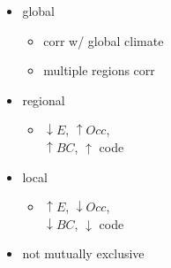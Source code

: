 \documentclass{beamer} \usepackage{amsmath,amsthm}
\begin{document}
\begin{frame}
\begin{columns}
\begin{column}{0.55\textwidth}
      \tiny{}
    \end{column}
    \begin{column}{0.45\textwidth}
      \begin{itemize}
        \item global
          \begin{itemize}
            \item corr w/ global climate
            \item multiple regions corr
          \end{itemize}
        \item regional
          \begin{itemize}
            \item \(\downarrow E\), \(\uparrow Occ\), \\\(\uparrow BC\), \(\uparrow\) code
          \end{itemize}
        \item local
          \begin{itemize}
            \item \(\uparrow E\), \(\downarrow Occ\), \\\(\downarrow BC\), \(\downarrow\) code
          \end{itemize}
        \item \alert{not mutually exclusive}
      \end{itemize}
    \end{column}
  \end{columns}
\end{frame}
\end{document}
